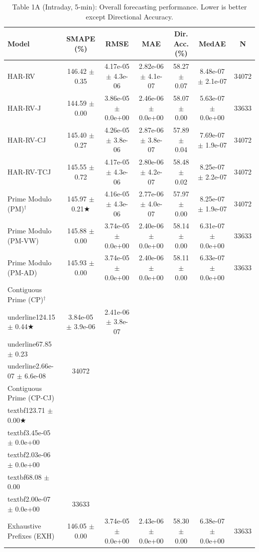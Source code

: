 \begin{table}[t]
\centering
\caption{Table 1A (Intraday, 5-min): Overall forecasting performance. Lower is better except Directional Accuracy.}
\label{tab:overall_intraday}
\begin{tabular}{lcccccc}
\toprule
Model & SMAPE (\%) & RMSE & MAE & Dir. Acc. (\%) & MedAE & N \\
\midrule
HAR-RV & 146.42 $\pm$ 0.35 & 4.17e-05 $\pm$ 4.3e-06 & 2.82e-06 $\pm$ 4.1e-07 & 58.27 $\pm$ 0.07 & 8.48e-07 $\pm$ 2.1e-07 & 34072 \\
HAR-RV-J & 144.59 $\pm$ 0.00 & 3.86e-05 $\pm$ 0.0e+00 & 2.46e-06 $\pm$ 0.0e+00 & 58.07 $\pm$ 0.00 & 5.63e-07 $\pm$ 0.0e+00 & 33633 \\
HAR-RV-CJ & 145.40 $\pm$ 0.27 & 4.26e-05 $\pm$ 3.8e-06 & 2.87e-06 $\pm$ 3.8e-07 & 57.89 $\pm$ 0.04 & 7.69e-07 $\pm$ 1.9e-07 & 34072 \\
HAR-RV-TCJ & 145.55 $\pm$ 0.72 & 4.17e-05 $\pm$ 4.3e-06 & 2.80e-06 $\pm$ 4.2e-07 & 58.48 $\pm$ 0.02 & 8.25e-07 $\pm$ 2.2e-07 & 34072 \\
Prime Modulo (PM)$^\dagger$ & 145.97 $\pm$ 0.21★ & 4.16e-05 $\pm$ 4.3e-06 & 2.77e-06 $\pm$ 4.0e-07 & 57.97 $\pm$ 0.00 & 8.25e-07 $\pm$ 1.9e-07 & 34072 \\
Prime Modulo (PM-VW) & 145.88 $\pm$ 0.00 & 3.74e-05 $\pm$ 0.0e+00 & 2.40e-06 $\pm$ 0.0e+00 & 58.14 $\pm$ 0.00 & 6.31e-07 $\pm$ 0.0e+00 & 33633 \\
Prime Modulo (PM-AD) & 145.93 $\pm$ 0.00 & 3.74e-05 $\pm$ 0.0e+00 & 2.40e-06 $\pm$ 0.0e+00 & 58.11 $\pm$ 0.00 & 6.33e-07 $\pm$ 0.0e+00 & 33633 \\
Contiguous Prime (CP)$^\dagger$ & \\underline{124.15 $\pm$ 0.44★} & 3.84e-05 $\pm$ 3.9e-06 & 2.41e-06 $\pm$ 3.8e-07 & \\underline{67.85 $\pm$ 0.23} & \\underline{2.66e-07 $\pm$ 6.6e-08} & 34072 \\
Contiguous Prime (CP-CJ) & \\textbf{123.71 $\pm$ 0.00★} & \\textbf{3.45e-05 $\pm$ 0.0e+00} & \\textbf{2.03e-06 $\pm$ 0.0e+00} & \\textbf{68.08 $\pm$ 0.00} & \\textbf{2.00e-07 $\pm$ 0.0e+00} & 33633 \\
Exhaustive Prefixes (EXH) & 146.05 $\pm$ 0.00 & 3.74e-05 $\pm$ 0.0e+00 & 2.43e-06 $\pm$ 0.0e+00 & 58.30 $\pm$ 0.00 & 6.38e-07 $\pm$ 0.0e+00 & 33633 \\

\end{tabular}
\end{table}
